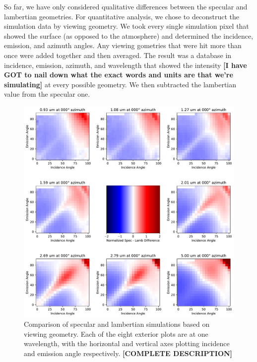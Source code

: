\documentclass{article}
\begin{document}
So far, we have only considered qualitative differences between the specular and lambertian geometries. For quantitative analysis, we chose to deconstruct the simulation data by viewing geometry. We took every single simulation pixel that showed the surface (as opposed to the atmosphere) and determined the incidence, emission, and azimuth angles. Any viewing gometries that were hit more than once were added together and then averaged. The result was a database in incidence, emission, azimuth, and wavelength that showed the intensity \textbf{\color{red}[I have GOT to nail down what the exact words and units are that we're simulating]\color{black}} at every possible geometry. We then subtracted the lambertian value from the specular one.

\begin{figure}[htb]
\includegraphics[scale = 0.44]{SpecLambNormDiff.pdf}
\centering
\caption{Comparison of specular and lambertian simulations based on viewing geometry. Each of the eight exterior plots are at one wavelength, with the horizontal and vertical axes plotting incidence and emission angle respectively. \textbf{\color{red}[COMPLETE DESCRIPTION]\color{black}}}
\label{fig:10}
\end{figure}
\end{document}
